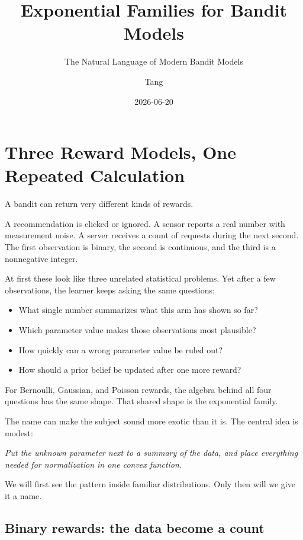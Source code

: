 \documentclass[en,nofont,11pt]{elegantbook}
\title{Exponential Families for Bandit Models}
\subtitle{The Natural Language of Modern Bandit Models}
\author{Tang}
\institute{Tang's Machine Learning Blog}
\date{2026-06-20}
\begin{document}
\maketitle
\frontmatter
\tableofcontents
\mainmatter

\chapter{Three Reward Models, One Repeated Calculation}

A bandit can return very different kinds of rewards.

A recommendation is clicked or ignored. A sensor reports a real number with measurement noise. A server receives a count of requests during the next second. The first observation is binary, the second is continuous, and the third is a nonnegative integer.

At first these look like three unrelated statistical problems. Yet after a few observations, the learner keeps asking the same questions:

\begin{itemize}
\item What single number summarizes what this arm has shown so far?
\item Which parameter value makes those observations most plausible?
\item How quickly can a wrong parameter value be ruled out?
\item How should a prior belief be updated after one more reward?
\end{itemize}

For Bernoulli, Gaussian, and Poisson rewards, the algebra behind all four questions has the same shape. That shared shape is the exponential family.

The name can make the subject sound more exotic than it is. The central idea is modest:

\begin{center}
\emph{Put the unknown parameter next to a summary of the data, and place everything needed for normalization in one convex function.}
\end{center}

We will first see the pattern inside familiar distributions. Only then will we give it a name.

\section{Binary rewards: the data become a count}
\end{document}
